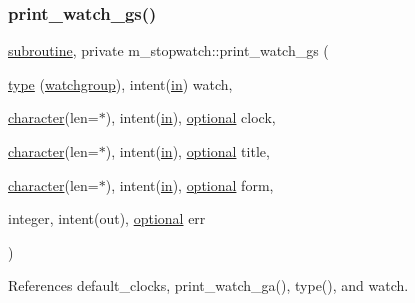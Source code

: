 \subsubsection{\texorpdfstring{print\+\_\+watch\+\_\+gs()}{print\_watch\_gs()}}
{\footnotesize\ttfamily \hyperlink{M__stopwatch_83_8txt_acfbcff50169d691ff02d4a123ed70482}{subroutine}, private m\+\_\+stopwatch\+::print\+\_\+watch\+\_\+gs (\begin{DoxyParamCaption}\item[{\hyperlink{stop__watch_83_8txt_a70f0ead91c32e25323c03265aa302c1c}{type} (\hyperlink{structm__stopwatch_1_1watchgroup}{watchgroup}), intent(\hyperlink{M__journal_83_8txt_afce72651d1eed785a2132bee863b2f38}{in})}]{watch,  }\item[{\hyperlink{option__stopwatch_83_8txt_abd4b21fbbd175834027b5224bfe97e66}{character}(len=$\ast$), intent(\hyperlink{M__journal_83_8txt_afce72651d1eed785a2132bee863b2f38}{in}), \hyperlink{option__stopwatch_83_8txt_aa4ece75e7acf58a4843f70fe18c3ade5}{optional}}]{clock,  }\item[{\hyperlink{option__stopwatch_83_8txt_abd4b21fbbd175834027b5224bfe97e66}{character}(len=$\ast$), intent(\hyperlink{M__journal_83_8txt_afce72651d1eed785a2132bee863b2f38}{in}), \hyperlink{option__stopwatch_83_8txt_aa4ece75e7acf58a4843f70fe18c3ade5}{optional}}]{title,  }\item[{\hyperlink{option__stopwatch_83_8txt_abd4b21fbbd175834027b5224bfe97e66}{character}(len=$\ast$), intent(\hyperlink{M__journal_83_8txt_afce72651d1eed785a2132bee863b2f38}{in}), \hyperlink{option__stopwatch_83_8txt_aa4ece75e7acf58a4843f70fe18c3ade5}{optional}}]{form,  }\item[{integer, intent(out), \hyperlink{option__stopwatch_83_8txt_aa4ece75e7acf58a4843f70fe18c3ade5}{optional}}]{err }\end{DoxyParamCaption})\hspace{0.3cm}{\ttfamily [private]}}



References default\+\_\+clocks, print\+\_\+watch\+\_\+ga(), type(), and watch.

\mbox{\label{namespacem__stopwatch_aa4b391b6d6f238d60db1630ff32f4a33}} 
